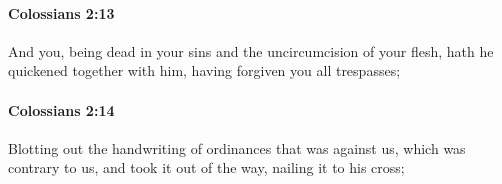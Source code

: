 		\paragraph{Colossians 2:13} %
			\label{COLOSSIANS-2-13}

			And you, being dead in your sins and the uncircumcision of your flesh, hath he quickened together with him, having forgiven you all trespasses;

			\begin{framed}
			\scriptsize
				\begin{compactdesc}
					\item[SBLG] 
				\end{compactdesc}
			\end{framed}

		\paragraph{Colossians 2:14} %
			\label{COLOSSIANS-2-14}

			Blotting out the handwriting of ordinances that was against us, which was contrary to us, and took it out of the way, nailing it to his cross;

